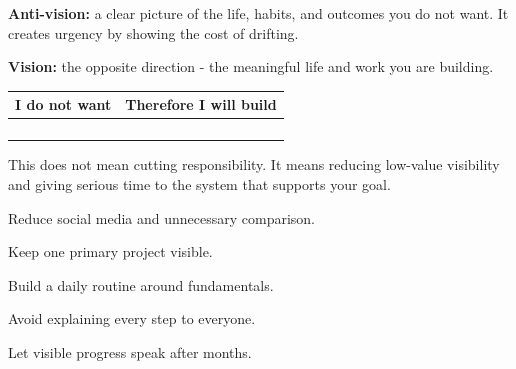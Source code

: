 \documentclass[10pt,a4paper]{article}
\newcommand{\CheckLine}{\raisebox{0.2ex}{\Large$\square$}\hspace{1mm}}
\begin{document}
\begin{minipage}[t]{0.48\linewidth}
\begin{tcolorbox}[usebox,title={Anti-vision to vision}]
\textbf{Anti-vision:} a clear picture of the life, habits, and outcomes you do not want. It creates urgency by showing the cost of drifting.\par\vspace{2mm}
\textbf{Vision:} the opposite direction - the meaningful life and work you are building.\par\vspace{3mm}
\begin{tabularx}{\linewidth}{X X}
\textbf{I do not want} & \textbf{Therefore I will build}\\\hline
\rule{0pt}{7mm} & \\
\rule{0pt}{7mm} & \\
\rule{0pt}{7mm} & \\
\rule{0pt}{7mm} & \\
\end{tabularx}
\end{tcolorbox}

\begin{tcolorbox}[usebox,title={Disappear for six months}]
This does not mean cutting responsibility. It means reducing low-value visibility and giving serious time to the system that supports your goal.\par\vspace{2mm}
\CheckLine Reduce social media and unnecessary comparison.\par
\CheckLine Keep one primary project visible.\par
\CheckLine Build a daily routine around fundamentals.\par
\CheckLine Avoid explaining every step to everyone.\par
\CheckLine Let visible progress speak after months.
\end{tcolorbox}
\end{minipage}\hfill
\end{document}
